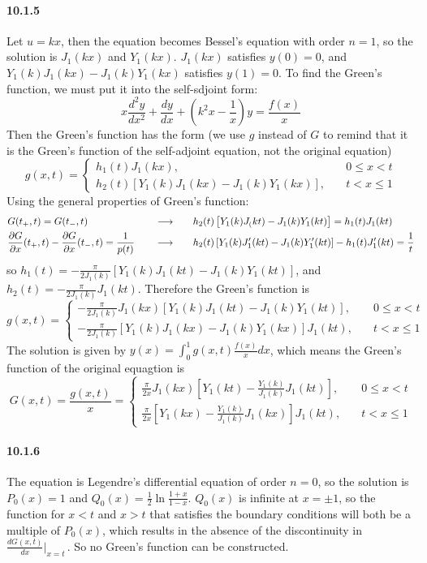 \documentclass[a4paper]{article}
\begin{document}
\paragraph{10.1.5}
Let $u=kx$, then the equation becomes Bessel's equation with order $n=1$, so the solution is $J_1(kx)$ and $Y_1(kx)$. \;$J_1(kx)$ satisfies $y(0)=0$, and $Y_1(k)J_1(kx)-J_1(k)Y_1(kx)$ satisfies $y(1)=0$. To find the Green's function, we must put it into the self-sdjoint form:
\[
x\frac{d^2y}{dx^2}+\frac{dy}{dx}+(k^2x-\frac{1}{x})y=\frac{f(x)}{x}
\]
Then the Green's function has the form (we use $g$ instead of $G$ to remind that it is the Green's function of the self-adjoint equation, not the original equation)
\[
g(x,t)=
\begin{cases}
h_1(t)J_1(kx),\quad & 0\leq x<t\\
h_2(t)\left[Y_1(k)J_1(kx)-J_1(k)Y_1(kx)\right],\quad & t<x\leq1
\end{cases}
\]
Using the general properties of Green's function:
\begin{alignat*}{3}
    & G(t_+,t)=G(t_-,t)\quad && \longrightarrow\quad && h_2(t)\left[Y_1(k)J_(kt)-J_1(k)Y_1(kt) \right]=h_1(t)J_1(kt) \\
    & \frac{\partial G}{\partial x}(t_+,t)-\frac{\partial G}{\partial x}(t_-,t)=\frac{1}{p(t)}\quad && \longrightarrow\quad && h_2(t)\left[Y_1(k)J_1'(kt)-J_1(k)Y_1'(kt) \right]-h_1(t)J_1'(kt)=\frac{1}{t}
\end{alignat*}
so $h_1(t)=-\frac{\pi}{2J_1(k)}\left[Y_1(k)J_1(kt)-J_1(k)Y_1(kt) \right]$, and $h_2(t)=-\frac{\pi}{2J_1(k)}J_1(kt)$. Therefore the Green's function is
\[
g(x,t)=
\begin{cases}
-\frac{\pi}{2J_1(k)}J_1(kx)\left[Y_1(k)J_1(kt)-J_1(k)Y_1(kt) \right] ,\quad & 0\leq x<t\\
-\frac{\pi}{2J_1(k)}\left[Y_1(k)J_1(kx)-J_1(k)Y_1(kx)\right]J_1(kt) ,\quad & t<x\leq1
\end{cases}
\]
The solution is given by $y(x)=\int_0^1g(x,t)\frac{f(x)}{x}dx$, which means the Green's function of the original equagtion is 
\[
G(x,t)=\frac{g(x,t)}{x}=
\begin{cases}
\frac{\pi}{2x}J_1(kx)\left[Y_1(kt)-\frac{Y_1(k)}{J_1(k)}J_1(kt) \right] ,\quad & 0\leq x<t\\[5pt]
\frac{\pi}{2x}\left[Y_1(kx)-\frac{Y_1(k)}{J_1(k)}J_1(kx) \right]J_1(kt) ,\quad & t<x\leq1
\end{cases}
\]

\paragraph{10.1.6}
The equation is Legendre's differential equation of order $n=0$, so the solution is $P_0(x)=1$ and $Q_0(x)=\frac{1}{2}\ln\frac{1+x}{1-x}$. \;$Q_0(x)$ is infinite at $x=\pm1$, so the function for $x<t$ and $x>t$ that satisfies the boundary conditions will both be a multiple of $P_0(x)$, which results in the absence of the discontinuity in $\frac{dG(x,t)}{dx}\big|_{x=t}$\,. So no Green's function can be constructed.
\end{document}
